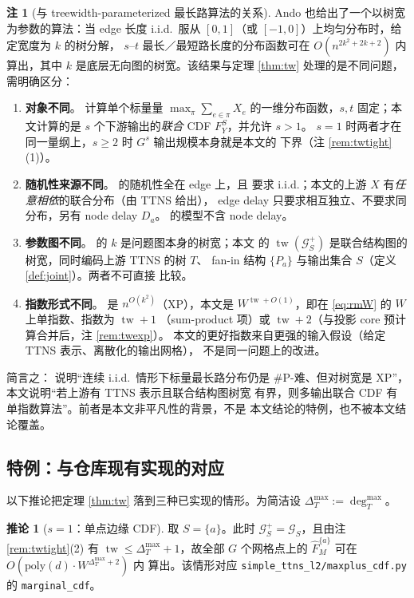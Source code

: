 \documentclass[a4paper,11pt]{article}
\theoremstyle{definition}
\newtheorem{corollary}{推论}
\newtheorem{remark}{注}
\newcommand{\1}{\mathbf 1}
\newcommand{\tw}{\operatorname{tw}}
\newcommand{\Gcal}{\mathcal G}
\begin{document}
\begin{remark}[与 treewidth-parameterized 最长路算法的关系]
\label{rem:ando}
Ando \cite[Theorem 1.10]{Ando2026} 也给出了一个以树宽为参数的算法：当 edge 长度
i.i.d.\ 服从 $[0,1]$（或 $[-1,0]$）上均匀分布时，给定宽度为 $k$ 的树分解，
$s$--$t$ 最长／最短路长度的分布函数可在
$O(n^{2k^2+2k+2})$ 内算出，其中 $k$ 是底层无向图的树宽。该结果与定理
\ref{thm:tw} 处理的是不同问题，需明确区分：
\begin{enumerate}[label=(\arabic*)]
\item \textbf{对象不同}。\cite{Ando2026} 计算单个标量量
$\max_{\pi}\sum_{e\in\pi}X_e$ 的一维分布函数，$s,t$ 固定；本文计算的是
$s$ 个下游输出的\emph{联合} CDF $F^S_Y$，并允许 $s>1$。
$s=1$ 时两者才在同一量纲上，$s\ge2$ 时 $G^s$ 输出规模本身就是本文的
下界（注 \ref{rem:twtight}(1)）。
\item \textbf{随机性来源不同}。\cite{Ando2026} 的随机性全在 edge 上，且
要求 i.i.d.；本文的上游 $X$ 有\emph{任意相依}的联合分布（由 TTNS 给出），
edge delay 只要求相互独立、不要求同分布，另有 node delay $D_a$。
\cite{Ando2026} 的模型不含 node delay。
\item \textbf{参数图不同}。\cite{Ando2026} 的 $k$ 是问题图本身的树宽；本文
的 $\tw(\Gcal_S^{+})$ 是联合结构图的树宽，同时编码上游 TTNS 的树 $T$、
fan-in 结构 $\{P_a\}$ 与输出集合 $S$（定义 \ref{def:joint}）。两者不可直接
比较。
\item \textbf{指数形式不同}。\cite{Ando2026} 是 $n^{O(k^2)}$（XP），本文是
$W^{\tw+O(1)}$，即在 \eqref{eq:rmW} 的 $W$ 上单指数、指数为 $\tw+1$
（sum-product 项）或 $\tw+2$（与投影 core 预计算合并后，注
\ref{rem:twexp}）。
本文的更好指数来自更强的输入假设（给定 TTNS 表示、离散化的输出网格），
不是同一问题上的改进。
\end{enumerate}
简言之：\cite{Ando2026} 说明“连续 i.i.d.\ 情形下标量最长路分布仍是
\#P-难、但对树宽是 XP”，本文说明“若上游有 TTNS 表示且联合结构图树宽
有界，则多输出联合 CDF 有单指数算法”。前者是本文非平凡性的背景，不是
本文结论的特例，也不被本文结论覆盖。
\end{remark}

\subsection{特例：与仓库现有实现的对应}

以下推论把定理 \ref{thm:tw} 落到三种已实现的情形。为简洁设
$\Delta_T^{\max}:=\deg_T^{\max}$。

\begin{corollary}[$s=1$：单点边缘 CDF]
\label{cor:s1}
取 $S=\{a\}$。此时 $\Gcal_S^{+}=\Gcal_S$，且由注 \ref{rem:twtight}(2)
有 $\tw\le\Delta_T^{\max}+1$，故全部 $G$ 个网格点上的
$\widehat F^{\{a\}}_{M}$ 可在 $O(\mathrm{poly}(d)\cdot W^{\Delta_T^{\max}+2})$ 内
算出。该情形对应
\texttt{simple\_ttns\_l2/}\allowbreak\texttt{maxplus\_cdf.py} 的
\texttt{marginal\_cdf}。
\end{corollary}
\end{document}
